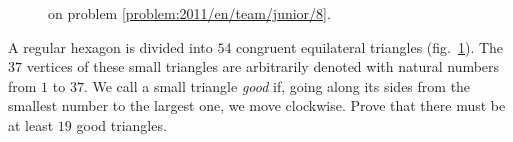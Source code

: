 \ifproblem
\begin{figure}\centering
    \caption{on problem \ref{problem:2011/en/team/junior/8}.}
    \label{fig:problem:2011/en/team/junior/8}
\end{figure}
\fi %

\problem{}
\label{problem:2011/en/team/junior/8}%
A regular hexagon is divided into $54$ congruent equilateral triangles
(fig.~\ref{fig:problem:2011/en/team/junior/8}).
The $37$ vertices of these small triangles are arbitrarily denoted with natural
numbers from $1$ to $37$.
We call a small triangle \emph{good} if, going along its sides from the
smallest number to the largest one, we move clockwise.
Prove that there must be at least $19$ good triangles.
\solution
\endproblem
